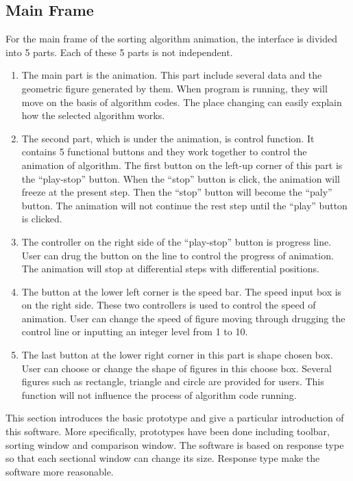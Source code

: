 \documentclass[paper=a4, fontsize=11pt,twoside]{scrartcl}		%
\begin{document}
\subsection{Main Frame}
For the main frame of the sorting algorithm animation, the interface is divided into 5 parts. Each of these 5 parts is not independent. 
\begin{enumerate}
   \item The main part is the animation. This part include several data and the geometric figure generated by them. When program is running, they will move on the basis of algorithm codes. The place changing can easily explain how the selected algorithm works. 
   \item The second part, which is under the animation, is control function. It contains 5 functional buttons and they work together to control the animation of algorithm. The first button on the left-up corner of this part is the “play-stop” button. When the “stop” button is click, the animation will freeze at the present step. Then the “stop” button will become the “paly” button. The animation will not continue the rest step until the “play” button is clicked. 
   \item The controller on the right side of the “play-stop” button is progress line. User can drug the button on the line to control the progress of animation. The animation will stop at differential steps with differential positions. 
   \item The button at the lower left corner is the speed bar. The speed input box is on the right side. These two controllers is used to control the speed of animation. User can change the speed of figure moving through drugging the control line or inputting an integer level from 1 to 10. 
   \item The last button at the lower right corner in this part is shape chosen box. User can choose or change the shape of figures in this choose box. Several figures such as rectangle, triangle and circle are provided for users. This function will not influence the process of algorithm code running. 

\end{enumerate}


This section introduces the basic prototype and give a particular introduction of this software. More specifically, prototypes have been done including toolbar, sorting window and comparison window. The software is based on response type so that each sectional window can change its size. Response type make the software more reasonable.
\end{document}
